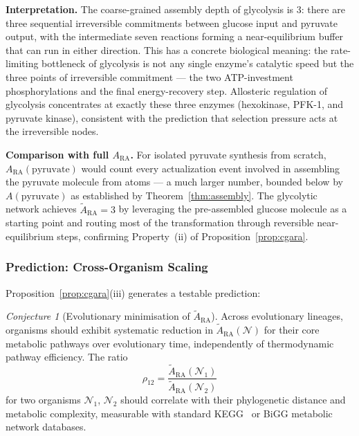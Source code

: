 \documentclass[11pt,a4paper]{article}
\theoremstyle{remark}
\newtheorem{conjecture}[theorem]{Conjecture}
\newcommand{\ARA}{A_{\mathrm{RA}}}
\begin{document}
\medskip\noindent
\textbf{Interpretation.} The coarse-grained assembly depth of glycolysis is
3: there are three sequential irreversible commitments between glucose input
and pyruvate output, with the intermediate seven reactions forming a
near-equilibrium buffer that can run in either direction. This has a concrete
biological meaning: the rate-limiting bottleneck of glycolysis is not any
single enzyme's catalytic speed but the three points of irreversible commitment
--- the two ATP-investment phosphorylations and the final energy-recovery step.
Allosteric regulation of glycolysis concentrates at exactly these three
enzymes (hexokinase, PFK-1, and pyruvate kinase), consistent with the
prediction that selection pressure acts at the irreversible nodes.

\medskip\noindent
\textbf{Comparison with full $\ARA$.} For isolated pyruvate synthesis from
scratch, $\ARA(\mathrm{pyruvate})$ would count every actualization event
involved in assembling the pyruvate molecule from atoms --- a much larger
number, bounded below by $A(\mathrm{pyruvate})$ as established by
Theorem~\ref{thm:assembly}. The glycolytic network achieves
$\tilde{A}_{\mathrm{RA}} = 3$ by leveraging the pre-assembled glucose
molecule as a starting point and routing most of the transformation through
reversible near-equilibrium steps, confirming Property~(ii) of
Proposition~\ref{prop:cgara}.

\subsubsection{Prediction: Cross-Organism Scaling}
\label{sec:scaling}

Proposition~\ref{prop:cgara}(iii) generates a testable prediction:

\begin{conjecture}[Evolutionary minimisation of $\tilde{A}_{\mathrm{RA}}$]
\label{conj:evolution}
Across evolutionary lineages, organisms should exhibit systematic reduction
in $\tilde{A}_{\mathrm{RA}}(\mathcal{N})$ for their core metabolic pathways
over evolutionary time, independently of thermodynamic pathway efficiency.
The ratio
\begin{equation}
  \rho_{12} = \frac{\tilde{A}_{\mathrm{RA}}(\mathcal{N}_1)}
                    {\tilde{A}_{\mathrm{RA}}(\mathcal{N}_2)}
  \label{eq:ratio}
\end{equation}
for two organisms $\mathcal{N}_1$, $\mathcal{N}_2$ should correlate with
their phylogenetic distance and metabolic complexity, measurable with
standard KEGG~\citep{KEGG2000} or BiGG metabolic network databases.
\end{conjecture}
\end{document}
